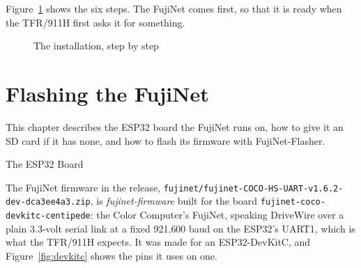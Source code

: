 \documentclass[10pt,twoside,openany]{book}
\makeatletter
\newcommand{\lfile}[1]{\nolinkurl{#1}}      %
\newcommand{\thesectname}{}
\newcommand{\chapterpages}{%
  \renewcommand{\thepage}{\thechapter--\arabic{page}}\setcounter{page}{1}}
\renewcommand{\section}{\@startsection{section}{1}{0pt}{3.2ex plus 1ex}{1.2ex}%
  {\sffamily\bfseries\large}}
\makeatother
\begin{document}
Figure~\ref{fig:steps} shows the six steps. The FujiNet comes first, so
that it is ready when the TFR/911H first asks it for something.

\begin{figure}[htbp]
\centering
{}
\caption{The installation, step by step}\label{fig:steps}
\end{figure}

\chapter{Flashing the FujiNet}
\chapterpages
\renewcommand{\thesectname}{Flashing the FujiNet}

This chapter describes the ESP32 board the FujiNet runs on, how to give
it an SD card if it has none, and how to flash its firmware with
FujiNet-Flasher.

\section{The ESP32 Board}

The FujiNet firmware in the release, \lfile{fujinet/fujinet-COCO-HS-UART-v1.6.2-dev-dca3ee4a3.zip},
is \emph{fujinet-firmware} built for the board
\texttt{fujinet-coco-devkitc-centipede}: the Color Computer's FujiNet,
speaking DriveWire over a plain 3.3-volt serial link at a fixed 921{,}600
baud on the ESP32's UART1, which is what the TFR/911H expects. It was made
for an ESP32-DevKitC, and Figure~\ref{fig:devkitc} shows the pins it uses
on one.
\end{document}
